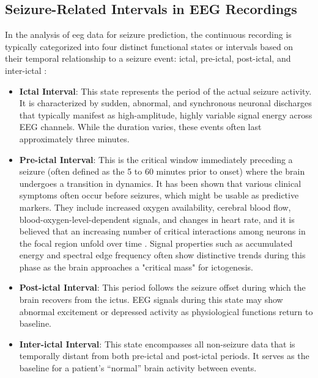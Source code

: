 \subsection{Seizure-Related Intervals in EEG Recordings}\label{subsec:background-periictal-intervals-in-eeg-recordings}

In the analysis of \gls{eeg} data for seizure prediction, the continuous recording is typically categorized into four distinct functional states or intervals based on their temporal relationship to a seizure event: ictal, pre-ictal, post-ictal, and inter-ictal \parencite{moghim_predicting_2014}:

\begin{itemize}
    \item \textbf{Ictal Interval}: This state represents the period of the actual seizure activity. It is characterized by sudden, abnormal, and synchronous neuronal discharges that typically manifest as high-amplitude, highly variable signal energy across EEG channels. While the duration varies, these events often last approximately three minutes.
    \item \textbf{Pre-ictal Interval}: This is the critical window immediately preceding a seizure (often defined as the 5 to 60 minutes prior to onset) where the brain undergoes a transition in dynamics.
    It has been shown that various clinical symptoms often occur before seizures, which might be usable as predictive markers.
    They include increased oxygen availability, cerebral blood flow, blood-oxygen-level-dependent signals, and changes in heart rate, and it is believed that an increasing number of critical interactions among neurons in the focal region unfold over time \parencite{moghim_predicting_2014}. 
    Signal properties such as accumulated energy and spectral edge frequency often show distinctive trends during this phase as the brain approaches a "critical mass" for ictogenesis.
    \item \textbf{Post-ictal Interval}: This period follows the seizure offset during which the brain recovers from the ictus. EEG signals during this state may show abnormal excitement or depressed activity as physiological functions return to baseline.
    \item \textbf{Inter-ictal Interval}: This state encompasses all non-seizure data that is temporally distant from both pre-ictal and post-ictal periods. It serves as the baseline for a patient's \enquote{normal} brain activity between events.
\end{itemize}

